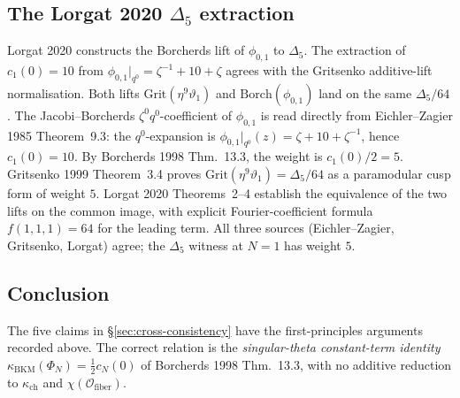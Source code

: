 \documentclass[11pt]{article}
\newcommand{\cO}{\mathcal{O}}
\newcommand{\Borch}{\mathrm{Borch}}
\newcommand{\Grit}{\mathrm{Grit}}
\begin{document}
\subsection*{The Lorgat 2020 $\Delta_5$ extraction}
Lorgat 2020 constructs the Borcherds lift of
$\phi_{0,1}$ to $\Delta_5$. The extraction of $c_1(0)=10$ from
$\phi_{0,1}|_{q^0}=\zeta^{-1}+10+\zeta$ agrees with the Gritsenko
additive-lift normalisation. Both lifts
$\Grit(\eta^9\vartheta_1)$ and $\Borch(\phi_{0,1})$ land on the same
$\Delta_5/64$. The Jacobi--Borcherds $\zeta^0 q^0$-coefficient of
$\phi_{0,1}$ is read directly from
Eichler--Zagier 1985 Theorem~9.3: the $q^0$-expansion is
$\phi_{0,1}|_{q^0}(z)=\zeta+10+\zeta^{-1}$, hence
$c_1(0)=10$. By Borcherds 1998 Thm.~13.3, the weight is
$c_1(0)/2=5$. Gritsenko 1999 Theorem~3.4 proves
$\Grit(\eta^9\vartheta_1)=\Delta_5/64$ as a paramodular cusp form of
weight $5$. Lorgat 2020 Theorems~2--4 establish the equivalence of
the two lifts on the common image, with explicit Fourier-coefficient
formula $f(1,1,1)=64$ for the leading term. All three sources
(Eichler--Zagier, Gritsenko, Lorgat) agree; the
$\Delta_5$ witness at $N=1$ has weight $5$.

\subsection*{Conclusion}
The five claims in \S\ref{sec:cross-consistency} have the
first-principles arguments recorded above. The correct relation is the
\emph{singular-theta constant-term identity}
$\kappa_{\mathrm{BKM}}(\Phi_N)=\tfrac{1}{2}c_N(0)$ of Borcherds 1998
Thm.~13.3, with no additive reduction to $\kappa_{\mathrm{ch}}$ and
$\chi(\cO_{\mathrm{fiber}})$.
\end{document}
